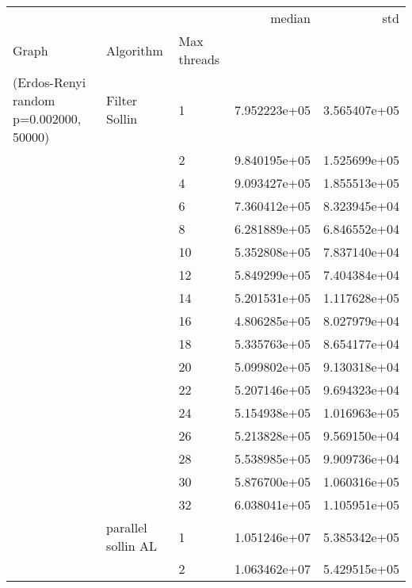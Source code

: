 \begin{tabular}{lllrr}
\toprule
                      &                     &    &        median &           std \\
Graph & Algorithm & Max threads &               &               \\
\midrule
(Erdos-Renyi random p=0.002000, 50000) & Filter Sollin & 1  &  7.952223e+05 &  3.565407e+05 \\
                      &                     & 2  &  9.840195e+05 &  1.525699e+05 \\
                      &                     & 4  &  9.093427e+05 &  1.855513e+05 \\
                      &                     & 6  &  7.360412e+05 &  8.323945e+04 \\
                      &                     & 8  &  6.281889e+05 &  6.846552e+04 \\
                      &                     & 10 &  5.352808e+05 &  7.837140e+04 \\
                      &                     & 12 &  5.849299e+05 &  7.404384e+04 \\
                      &                     & 14 &  5.201531e+05 &  1.117628e+05 \\
                      &                     & 16 &  4.806285e+05 &  8.027979e+04 \\
                      &                     & 18 &  5.335763e+05 &  8.654177e+04 \\
                      &                     & 20 &  5.099802e+05 &  9.130318e+04 \\
                      &                     & 22 &  5.207146e+05 &  9.694323e+04 \\
                      &                     & 24 &  5.154938e+05 &  1.016963e+05 \\
                      &                     & 26 &  5.213828e+05 &  9.569150e+04 \\
                      &                     & 28 &  5.538985e+05 &  9.909736e+04 \\
                      &                     & 30 &  5.876700e+05 &  1.060316e+05 \\
                      &                     & 32 &  6.038041e+05 &  1.105951e+05 \\
                      & parallel sollin AL & 1  &  1.051246e+07 &  5.385342e+05 \\
                      &                     & 2  &  1.063462e+07 &  5.429515e+05 \\

\end{tabular}
